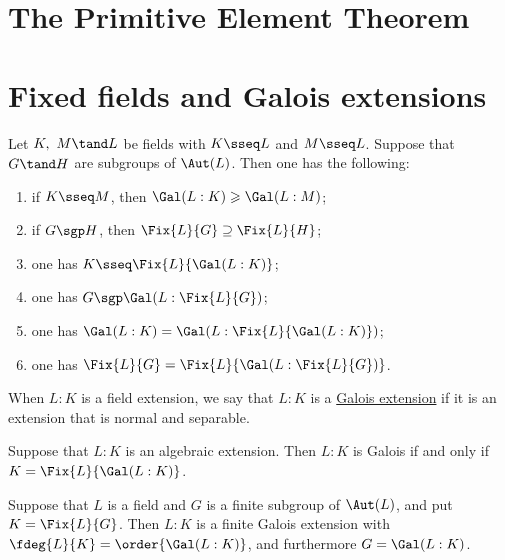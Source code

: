 \documentclass[a4paper]{article}
\begin{document}





\section{The Primitive Element Theorem}

\section{Fixed fields and Galois extensions}
\begin{tproposition}
  Let \( K,\ M \tand L \) be fields with \( K\sseq L \) and \( M\sseq L \).
  Suppose that \( G\tand H \) are subgroups of \( \Aut(L) \).
  Then one has the following: \begin{enumerate}[label=(\alph*)]
    \item if \( K\sseq M \), then \( \Gal(L:K) \geqslant \Gal(L:M) \);
    \item if \( G\sgp H \), then \( \Fix{L}{G} \supseteq \Fix{L}{H} \);
    \item one has \( K\sseq \Fix{L}{\Gal(L:K)} \);
    \item one has \( G\sgp\Gal(L:\Fix{L}{G}) \);
    \item one has \( \Gal(L:K) = \Gal(L:\Fix{L}{\Gal(L:K)}) \);
    \item one has \( \Fix{L}{G} = \Fix{L}{\Gal(L:\Fix{L}{G})} \).
  \end{enumerate}
\end{tproposition}

\begin{tdefinition}
  When \( L:K \) is a field extension, we say that \( L:K \) is a \ul{Galois extension} if it is an extension that is normal and separable.
\end{tdefinition}

\begin{ttheorem}
  Suppose that \( L:K \) is an algebraic extension.
  Then \( L:K \) is Galois if and only if \( K=\Fix{L}{\Gal(L:K)} \).
\end{ttheorem}

\begin{ttheorem}
  Suppose that \( L \) is a field and \( G \) is a finite subgroup of \( \Aut(L) \), and put \( K=\Fix{L}{G} \).
  Then \( L:K \) is a finite Galois extension with \( \fdeg{L}{K}=\order{\Gal(L:K)} \), and furthermore \( G=\Gal(L:K) \).
\end{ttheorem}
\end{document}
